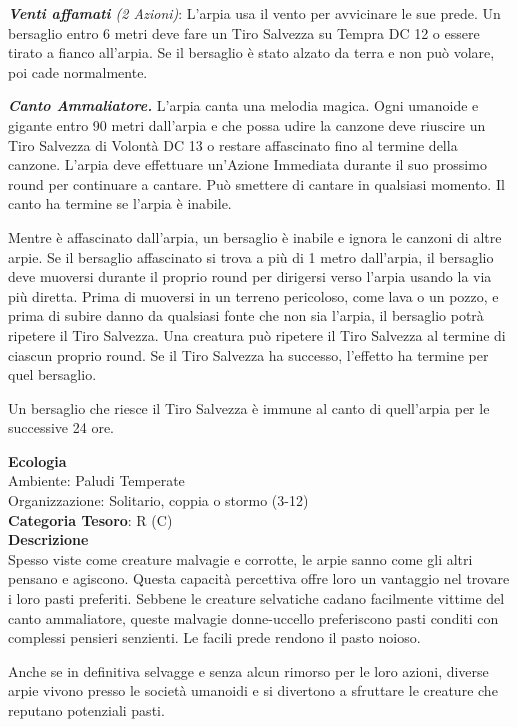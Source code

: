 \begin{multicols}{2}
{\emph{\textbf{Venti affamati} (2 Azioni)}: L'arpia usa il vento per avvicinare le sue prede. Un bersaglio entro 6 metri deve fare un Tiro Salvezza su Tempra DC 12 o essere tirato a fianco all'arpia. Se il bersaglio è stato alzato da terra e non può volare, poi cade normalmente.

\emph{\textbf{Canto Ammaliatore.}} L'arpia canta una melodia magica. Ogni umanoide e gigante entro 90 metri dall'arpia e che possa udire la canzone deve riuscire un Tiro Salvezza di Volontà DC 13 o restare affascinato fino al termine della canzone. L'arpia deve effettuare un'Azione Immediata durante il suo prossimo round per continuare a cantare. Può smettere di cantare in qualsiasi momento. Il canto ha termine se l'arpia è inabile.

Mentre è affascinato dall'arpia, un bersaglio è inabile e ignora le canzoni di altre arpie. Se il bersaglio affascinato si trova a più di 1 metro dall'arpia, il bersaglio deve muoversi durante il proprio round per dirigersi verso l'arpia usando la via più diretta. Prima di muoversi in un terreno pericoloso, come lava o un pozzo, e prima di subire danno da qualsiasi fonte che non sia l'arpia, il bersaglio potrà ripetere il Tiro Salvezza. Una creatura può ripetere il Tiro Salvezza al termine di ciascun proprio round. Se il Tiro Salvezza ha successo, l'effetto ha termine per quel bersaglio.

Un bersaglio che riesce il Tiro Salvezza è immune al canto di quell'arpia per le successive 24 ore.

\textbf{Ecologia}\\
Ambiente: Paludi Temperate\\
Organizzazione: Solitario, coppia o stormo (3-12)\\
\textbf{Categoria Tesoro}: R (C)\\
\textbf{Descrizione}\\
Spesso viste come creature malvagie e corrotte, le arpie sanno come gli altri pensano e agiscono. Questa capacità percettiva offre loro un vantaggio nel trovare i loro pasti preferiti. Sebbene le creature selvatiche cadano facilmente vittime del canto ammaliatore, queste malvagie donne-uccello preferiscono pasti conditi con complessi pensieri senzienti. Le facili prede rendono il pasto noioso.

Anche se in definitiva selvagge e senza alcun rimorso per le loro azioni, diverse arpie vivono presso le società umanoidi e si divertono a sfruttare le creature che reputano potenziali pasti.

}
\end{multicols}
